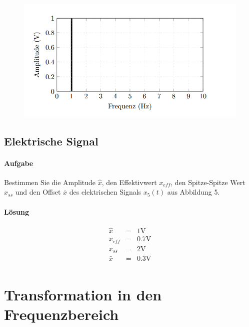 \documentclass[10pt]{scrreprt}
\begin{document}
        \begin{center}
            \begin{figure}[H]
                \includegraphics[width=\textwidth]{vorbereitenderBullshit.png}
            \end{figure}
        \end{center}

        \subsection{Elektrische Signal}
        \paragraph{Aufgabe}
        Bestimmen Sie die Amplitude $\hat{x}$, den Effektivwert $x_{eff}$, den Spitze-Spitze Wert $x_{ss}$ und
        den Offset $\bar{x}$ des elektrischen Signals $x_5(t)$ aus Abbildung 5.

        \paragraph{Lösung}
        \begin{eqnarray*}
            \hat{x} &=& 1\si{\volt}\\
            x_{eff} &=& 0.7\si{\volt}\\
            x_{ss} &=& 2\si{\volt}\\
            \bar{x} &=& 0.3\si{\volt}\\
        \end{eqnarray*}


        \section{Transformation in den Frequenzbereich}
\end{document}
